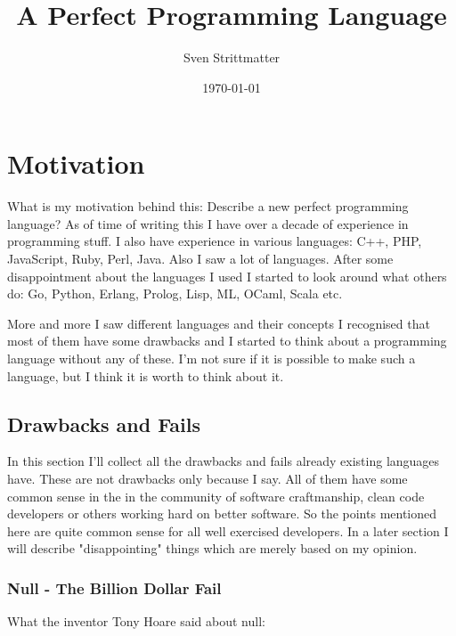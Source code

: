 \documentclass[a4paper,12pt]{article}
\title{A Perfect Programming Language}
\author{Sven Strittmatter}
\date{\today}
\begin{document}
\maketitle
{}
\newpage

\tableofcontents
\newpage

\section{Motivation}

What is my motivation behind this: Describe a new perfect programming language? As of time of writing this I have over a decade of experience in programming stuff. I also have experience in various languages: C++, PHP, JavaScript, Ruby, Perl, Java. Also I saw a lot of languages. After some disappointment about the languages I used I started to look around what others do: Go, Python, Erlang, Prolog, Lisp, ML, OCaml, Scala etc.

More and more I saw different languages and their concepts I recognised that most of them have some drawbacks and I started to think about a programming language without any of these. I'm not sure if it is possible to make such a language, but I think it is worth to think about it.

\subsection{Drawbacks and Fails}

In this section I'll collect all the drawbacks and fails already existing languages have. These are not drawbacks only because I say. All of them have some common sense in the in the community of software craftmanship, clean code developers or others working hard on better software. So the points mentioned here are quite common sense for all well exercised developers. In a later section I will describe "disappointing" things which are merely based on my opinion.

\subsubsection{Null - The Billion Dollar Fail}

What the inventor Tony Hoare\cite{hoare-wiki} said about null\cite{hoeare-null}:
\end{document}

